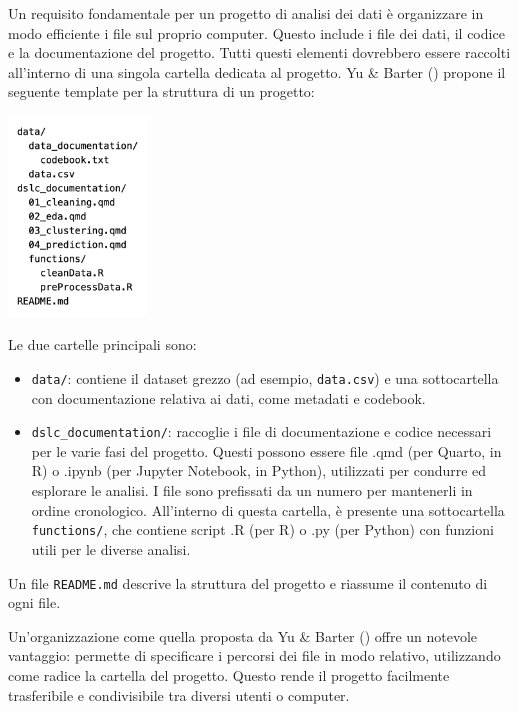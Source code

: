 \documentclass[
  letterpaper,
  DIV=11,
  numbers=noendperiod]{scrreprt}
\providecommand{\tightlist}{%
  \setlength{\itemsep}{0pt}\setlength{\parskip}{0pt}}\usepackage{longtable,booktabs,array}
\theoremstyle{definition}
\theoremstyle{remark}
\begin{document}
Un requisito fondamentale per un progetto di analisi dei dati è
organizzare in modo efficiente i file sul proprio computer. Questo
include i file dei dati, il codice e la documentazione del progetto.
Tutti questi elementi dovrebbero essere raccolti all'interno di una
singola cartella dedicata al progetto. Yu \& Barter
() propone il seguente template per
la struttura di un progetto:

\includegraphics[width=0.275\textwidth,height=\textheight]{chapters/eda/../../figures/project_structure.png}

Le due cartelle principali sono:

\begin{itemize}
\tightlist
\item
  \texttt{data/}: contiene il dataset grezzo (ad esempio,
  \texttt{data.csv}) e una sottocartella con documentazione relativa ai
  dati, come metadati e codebook.
\item
  \texttt{dslc\_documentation/}: raccoglie i file di documentazione e
  codice necessari per le varie fasi del progetto. Questi possono essere
  file .qmd (per Quarto, in R) o .ipynb (per Jupyter Notebook, in
  Python), utilizzati per condurre ed esplorare le analisi. I file sono
  prefissati da un numero per mantenerli in ordine cronologico.
  All'interno di questa cartella, è presente una sottocartella
  \texttt{functions/}, che contiene script .R (per R) o .py (per Python)
  con funzioni utili per le diverse analisi.
\end{itemize}

Un file \texttt{README.md} descrive la struttura del progetto e riassume
il contenuto di ogni file.

Un'organizzazione come quella proposta da Yu \& Barter
() offre un notevole vantaggio:
permette di specificare i percorsi dei file in modo relativo,
utilizzando come radice la cartella del progetto. Questo rende il
progetto facilmente trasferibile e condivisibile tra diversi utenti o
computer.
\end{document}
